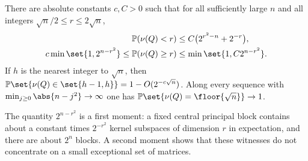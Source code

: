 \begin{theorem}\label{spn:thm:threshold}
There are absolute constants $c,C>0$ such that for all sufficiently large $n$ and all integers
$\sqrt n/2\le r\le2\sqrt n$,
\begin{align}
 \spnP(\nu(Q)<r)&\le C\bigl(2^{r^2-n}+2^{-r}\bigr),\label{spn:eq:fail}\\
 c\min\set{1,2^{n-r^2}}\le\spnP(\nu(Q)\ge r)&\le\min\set{1,C2^{n-r^2}}.\label{spn:eq:hit}
\end{align}
If $h$ is the nearest integer to $\sqrt n$, then
$\spnP\set{\nu(Q)\in\set{h-1,h}}=1-O(2^{-c\sqrt n})$. Along every sequence with
$\min_{j\ge0}\abs{n-j^2}\to\infty$ one has $\spnP\set{\nu(Q)=\floor{\sqrt n}}\to1$.
\end{theorem}

The quantity $2^{n-r^2}$ is a first moment: a fixed central principal block contains about a
constant times $2^{-r^2}$ kernel subspaces of dimension $r$ in expectation, and there are about
$2^n$ blocks. A second moment shows that these witnesses do not concentrate on a small
exceptional set of matrices.

